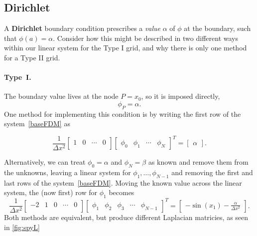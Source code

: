 \subsection{Dirichlet}
\label{sec:bc-dirichlet}


A \textbf{Dirichlet} boundary condition prescribes a \emph{value} $\alpha$ of $\phi$ at
the boundary, such that $\phi(a) = \alpha$. Consider how this might be described in two different ways within our linear system for the Type I grid, and why there is only one method for a Type II grid.
 \\

\paragraph{Type~I.} The boundary value lives at the node $P = x_0$, so it is
imposed directly,
\begin{equation}
    \phi_P = \alpha .
\end{equation}
One method for implementing this condition is by writing the first row of the system~\eqref{baseFDM} as 

\begin{equation}
    \frac{1}{\Delta x^2}
    \begin{bmatrix}
        1& 0 & \cdots & 0\\
    \end{bmatrix}
    \begin{bmatrix}
        \phi_0 & \phi_1 &  \cdots  & \phi_N
    \end{bmatrix}^T
    =
    \begin{bmatrix}
        \alpha
    \end{bmatrix}. \label{basicDir}
\end{equation}

\noindent Alternatively, we can treat $\phi_0 = \alpha$ and $\phi_N = \beta$ as known and
remove them from the unknowns, leaving a linear system for $\phi_1,\dots,\phi_{N-1}$ and removing the first and last rows of the system~\eqref{baseFDM}. Moving the
known value across the linear system, the (now first) row for $\phi_1$ becomes
\begin{equation}
    \frac{1}{\Delta x^2}
    \begin{bmatrix}
        -2& 1 & 0 & \cdots & 0\\
    \end{bmatrix}
    \begin{bmatrix}
        \phi_1 & \phi_2 & \phi_3 &  \cdots  & \phi_{N-1}
    \end{bmatrix}^T
    =
    \begin{bmatrix}
        -\sin(x_1) - \frac{\alpha}{\Delta x^2}
    \end{bmatrix}. \label{rhsDirTop}
\end{equation}
Both methods are equivalent, but produce different Laplacian matricies, as seen in \ref{fig:spyL}

